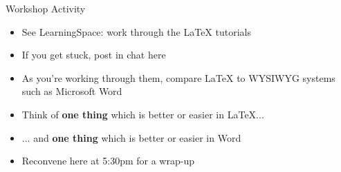 \begin{frame}{Workshop Activity}
	\begin{itemize}
		\pause\item See LearningSpace: work through the LaTeX tutorials
		\pause\item If you get stuck, post in chat here
		\pause\item As you're working through them, compare LaTeX to WYSIWYG systems such as Microsoft Word
		\pause\item Think of \textbf{one thing} which is better or easier in LaTeX...
		\pause\item ... and \textbf{one thing} which is better or easier in Word
		\pause\item Reconvene here at 5:30pm for a wrap-up
    \end{itemize}
\end{frame}


